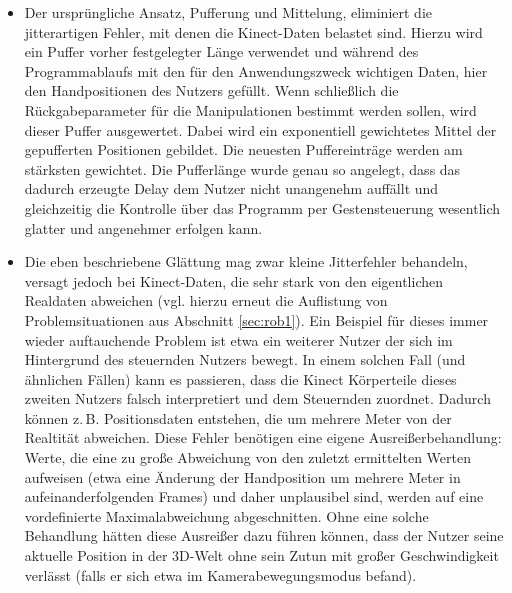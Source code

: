 	\begin{itemize}
	\item Der ursprüngliche Ansatz, Pufferung und Mittelung, eliminiert die jitterartigen Fehler, mit denen die Kinect-Daten belastet sind. Hierzu wird ein Puffer vorher festgelegter Länge verwendet und während des Programmablaufs mit den für den Anwendungszweck wichtigen Daten, hier den Handpositionen des Nutzers gefüllt. Wenn schließlich die Rückgabeparameter für die Manipulationen bestimmt werden sollen, wird dieser Puffer ausgewertet. Dabei wird ein exponentiell gewichtetes Mittel der gepufferten Positionen gebildet. Die neuesten Puffereinträge werden am stärksten gewichtet. Die Pufferlänge wurde genau so angelegt, dass das dadurch erzeugte Delay dem Nutzer nicht unangenehm auffällt und gleichzeitig die Kontrolle über das Programm per Gestensteuerung wesentlich glatter und angenehmer erfolgen kann.
	\item Die eben beschriebene Glättung mag zwar kleine Jitterfehler behandeln, versagt jedoch bei Kinect-Daten, die sehr stark von den eigentlichen Realdaten abweichen (vgl. hierzu erneut die Auflistung von Problemsituationen aus Abschnitt \ref{sec:rob1}). Ein Beispiel für dieses immer wieder auftauchende Problem ist etwa ein weiterer Nutzer der sich im Hintergrund des steuernden Nutzers bewegt. In einem solchen Fall (und ähnlichen Fällen) kann es passieren, dass die Kinect Körperteile dieses zweiten Nutzers falsch interpretiert und dem Steuernden zuordnet. Dadurch können z.\,B. Positionsdaten entstehen, die um mehrere Meter von der Realtität abweichen. Diese Fehler benötigen eine eigene Ausreißerbehandlung: Werte, die eine zu große Abweichung von den zuletzt ermittelten Werten aufweisen (etwa eine Änderung der Handposition um mehrere Meter in aufeinanderfolgenden Frames) und daher unplausibel sind, werden auf eine vordefinierte Maximalabweichung abgeschnitten. Ohne eine solche Behandlung hätten diese Ausreißer dazu führen können, dass der Nutzer seine aktuelle Position in der 3D-Welt ohne sein Zutun mit großer Geschwindigkeit verlässt (falls er sich etwa im Kamerabewegungsmodus befand).\end{itemize}
